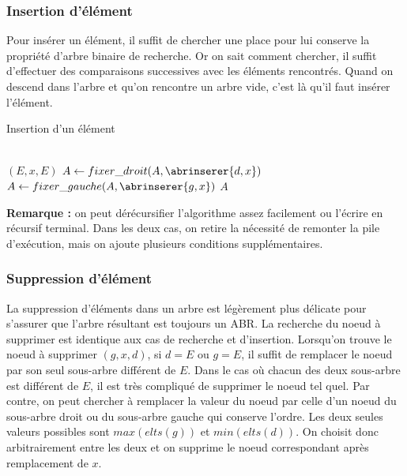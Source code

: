 \documentclass[../../../main.tex]{subfiles}
\begin{document}
\subsubsection{Insertion d'élément}
Pour insérer un élément, il suffit de chercher une place pour lui conserve la propriété d'arbre binaire de recherche. Or on sait comment chercher, il suffit d'effectuer des comparaisons successives avec les éléments rencontrés. Quand on descend dans l'arbre et qu'on rencontre un arbre vide, c'est là qu'il faut insérer l'élément.

\begin{algorithm}
\caption{Insertion d'un élément \label{alg:insertion_abr}}
\Indm\nonl{} \\
\Indp
{} {
	 {
		\Return $(E, x, E)$
	}
	 {
		 {
			$A \leftarrow fixer\_droit(A, \abrinserer{d, x})$
		} {
			$A \leftarrow fixer\_gauche(A, \abrinserer{g, x})$\;
		}
		\Return $A$
	}
}
\end{algorithm}

\textbf{Remarque :} on peut dérécursifier l'algorithme assez facilement ou l'écrire en récursif terminal. Dans les deux cas, on retire la nécessité de remonter la pile d'exécution, mais on ajoute plusieurs conditions supplémentaires.
\subsubsection{Suppression d'élément}
La suppression d'éléments dans un arbre est légèrement plus délicate pour s'assurer que l'arbre résultant est toujours un ABR. La recherche du noeud à supprimer est identique aux cas de recherche et d'insertion. Lorsqu'on trouve le noeud à supprimer $(g, x, d)$, si $d = E$ ou $g = E$, il suffit de remplacer le noeud par son seul sous-arbre différent de $E$. Dans le cas où chacun des deux sous-arbre est différent de $E$, il est très compliqué de supprimer le noeud tel quel. Par contre, on peut chercher à remplacer la valeur du noeud par celle d'un noeud du sous-arbre droit ou du sous-arbre gauche qui conserve l'ordre. Les deux seules valeurs possibles sont $max(elts(g))$ et $min(elts(d))$. On choisit donc arbitrairement entre les deux et on supprime le noeud correspondant après remplacement de $x$.
\end{document}
